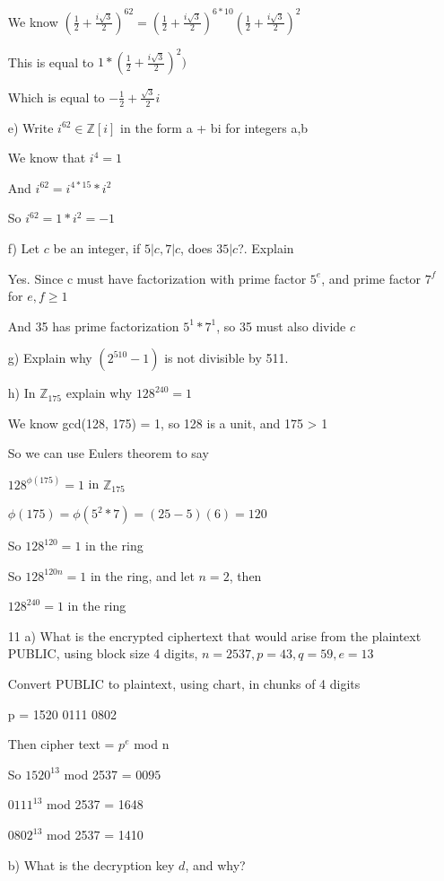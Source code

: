 \documentclass[11pt]{article}
\begin{document}
\begin{itemize}
  We know $(\frac{1}{2} + \frac{i\sqrt{3}}{2})^{62} = (\frac{1}{2} + \frac{i\sqrt{3}}{2})^{6*10}(\frac{1}{2} + \frac{i\sqrt{3}}{2})^{2}$

  This is equal to $1*(\frac{1}{2} + \frac{i\sqrt{3}}{2})^{2})$

  Which is equal to $-\frac{1}{2} + \frac{\sqrt{3}}{2}i$

  e) Write $i^{62} \in \mathbb{Z}[i]$ in the form a + bi for integers a,b

  We know that $i^4 = 1$

  And $i^{62} = i^{4*15}*i^2$

  So $i^{62} = 1*i^2 = -1$

  f) Let $c$ be an integer, if $5|c, 7|c$, does $35|c$?. Explain

  Yes. Since c must have factorization with prime factor $5^e$, and prime factor $7^f$ for $e,f \geq 1$

  And 35 has prime factorization $5^1 * 7^1$, so 35 must also divide $c$

  g) Explain why $(2^{510} - 1)$ is not divisible by 511.

  h) In $\mathbb{Z}_{175}$ explain why $128^{240} = 1$

  We know gcd(128, 175) = 1, so 128 is a unit, and 175 > 1

  So we can use Eulers theorem to say

  $128^{\phi(175)} = 1$ in $\mathbb{Z}_{175}$

  $\phi(175) = \phi(5^2 * 7) = (25 - 5)(6) = 120$

  So $128^{120} = 1$ in the ring

  So $128^{120n} = 1$ in the ring, and let $n = 2$, then

  $128^{240} = 1$ in the ring

\item[11]
  a) What is the encrypted ciphertext that would arise from the plaintext PUBLIC, using block size 4 digits, $n = 2537, p = 43, q = 59, e = 13$

  Convert PUBLIC to plaintext, using chart, in chunks of 4 digits

  p = 1520 0111 0802

  Then cipher text = $p^{e}$ mod n

  So $1520^{13}$ mod 2537 = $0095$

  $0111^{13}$ mod 2537 = 1648

  $0802^{13}$ mod 2537 = 1410

  b) What is the decryption key $d$, and why?


\end{itemize}
\end{document}
